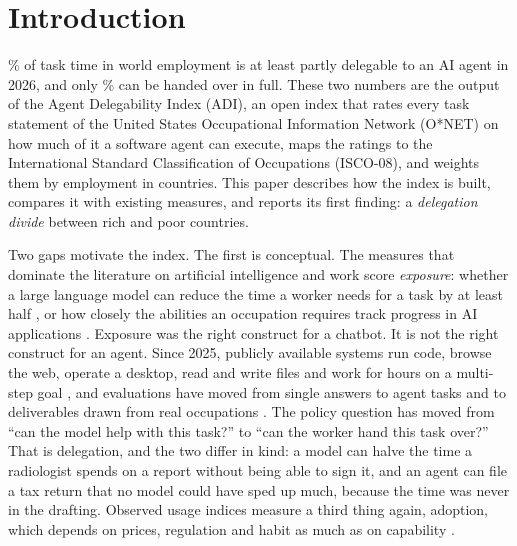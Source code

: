 \section{Introduction}
\label{sec:intro}

\% of task time in world employment is at least partly delegable to an AI agent in 2026, and only \% can be handed over in full.
These two numbers are the output of the Agent Delegability Index (ADI), an open index that rates every task statement of the United States Occupational Information Network (O*NET) on how much of it a software agent can execute, maps the ratings to the International Standard Classification of Occupations (ISCO-08), and weights them by employment in  countries.
This paper describes how the index is built, compares it with existing measures, and reports its first finding: a \emph{delegation divide} between rich and poor countries.

Two gaps motivate the index.
The first is conceptual.
The measures that dominate the literature on artificial intelligence and work score \emph{exposure}: whether a large language model can reduce the time a worker needs for a task by at least half \citep{eloundou2024gpts}, or how closely the abilities an occupation requires track progress in AI applications \citep{felten2021occupational, webb2020impact}.
Exposure was the right construct for a chatbot.
It is not the right construct for an agent.
Since 2025, publicly available systems run code, browse the web, operate a desktop, read and write files and work for hours on a multi-step goal \citep{metr2025measuring}, and evaluations have moved from single answers to agent tasks and to deliverables drawn from real occupations \citep{kapoor2024agents, patwardhan2025gdpval}.
The policy question has moved from ``can the model help with this task?'' to ``can the worker hand this task over?''
That is delegation, and the two differ in kind: a model can halve the time a radiologist spends on a report without being able to sign it, and an agent can file a tax return that no model could have sped up much, because the time was never in the drafting.
Observed usage indices measure a third thing again, adoption, which depends on prices, regulation and habit as much as on capability \citep{aei2025economic, lee2026delegates, henseke2026exposure}.

